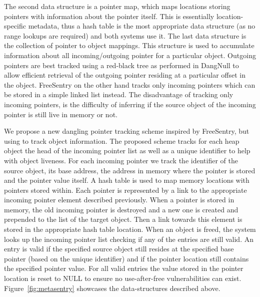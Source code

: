The second data structure is a pointer map, which maps locations storing pointers with information about the
pointer itself. This is essentially location-specific metadata, thus a hash table is the most appropriate
data structure (as no range lookups are required) and both systems use it. The last data structure is the collection
of pointer to object mappings. This structure is used to accumulate information about all incoming/outgoing pointer
for a particular object.  Outgoing pointers are best tracked using a red-black tree as performed in DangNull to
allow efficient retrieval of the outgoing pointer residing at a particular offset in the object. FreeSentry on the
other hand tracks only incoming pointers which can be stored in a simple linked list instead. The disadvantage of
tracking only incoming pointers, is the difficulty of inferring if the source object of the incoming pointer is
still live in memory or not.

We propose a new dangling pointer tracking scheme inspired by FreeSentry, but using \projectname{} to track
object information. The proposed scheme tracks for each heap object the head of the
incoming pointer list as well as a unique identifier to help with object liveness. For each incoming pointer
we track the identifier of the source object, its base address, the address in memory where the pointer is stored
and the pointer value itself.
A hash table is used to map memory
locations with pointers stored within. Each pointer is represented by a link to the appropriate incoming pointer
element described previously. When a pointer is stored in memory, the old incoming pointer is destroyed and a new
one is created and prepended to the list of the target object. Then a link towards this element is stored in the appropriate
hash table location. When an object is freed, the system looks up the incoming pointer list checking if any of the entries
are still valid. An entry is valid if the specified source object still resides at the specified base pointer (based on the
unique identifier) and if the pointer location still contains the specified pointer value. For all valid entries the value stored
in the pointer location is reset to NULL to ensure no use-after-free vulnerabilities can exist. Figure~\ref{fig:metasentry}
showcases the data-structures described above.

